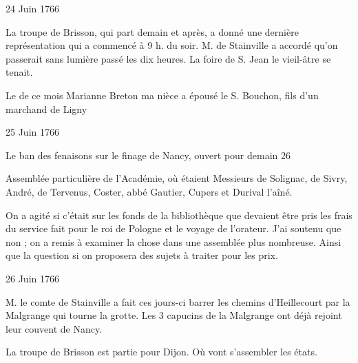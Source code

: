                      \begin{diary}{24 Juin 1766}{}

                         La troupe de Brisson, qui part demain et
                           après, a donné une dernière représentation
                           qui a commencé à 9 h. du soir. M. de
                              Stainville
                           a accordé qu'on passerait sans lumière passé les
                           dix heures. La foire de S. Jean le
                              vieil-âtre
                           se
                           tenait. \bigskip


                         Le  de ce mois Marianne Breton
                           ma nièce a épousé le S.
                              Bouchon, fils d'un marchand de Ligny
                        \bigskip


                     \end{diary}

                     \begin{diary}{25 Juin 1766}{}

                         Le ban des fenaisons sur le finage
                           de Nancy, ouvert pour demain 26
                        \bigskip


                         Assemblée particulière de l'Académie, où étaient
                           Messieurs
                           de Solignac,
                           de Sivry, André, de Tervenus,
                           Coster, abbé Gautier, Cupers et
                              Durival l'aîné.
                        \bigskip


                         On a agité si c'était sur les
                           fonds de la bibliothèque
                           que devaient être pris les frais du service fait
                           pour le roi de Pologne et le voyage de l'orateur. J'ai
                           soutenu que non ; on a remis à examiner la
                           chose dans une assemblée plus nombreuse.
                           Ainsi que la question si on proposera des
                           sujets à traiter pour les prix. \bigskip


                     \end{diary}

                     \begin{diary}{26 Juin 1766}{}


                           M. le comte de Stainville a fait
                           ces jours-ci
                           barrer les chemins
                              d'Heillecourt par la Malgrange
                           qui tourne la grotte. Les 3 capucins de
                           la Malgrange ont déjà
                           rejoint leur couvent
                           de Nancy. \bigskip


                         La troupe de Brisson est partie pour Dijon. Où vont s'assembler les états. \bigskip


                     \end{diary}

